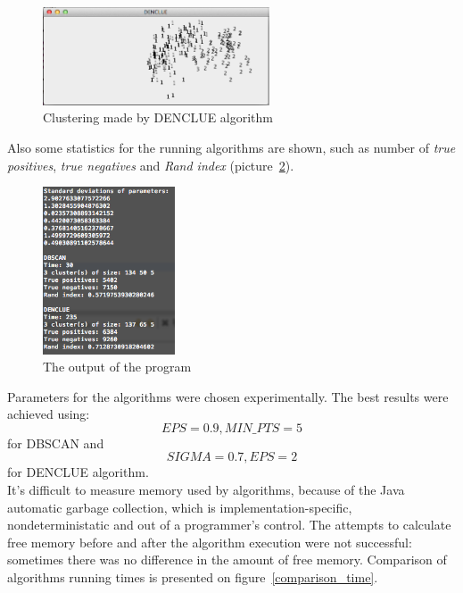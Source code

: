 \documentclass[12pt, a4paper, notitlepage, oneside]{article}
\begin{document}
\begin{figure}[!ht]
 	\centering
	\includegraphics[width=0.6\textwidth]{images/denclue.png}
 	\caption[]
	{Clustering made by DENCLUE algorithm}
		\label{denclue}
	\end{figure}

Also some statistics for the running algorithms are shown, such as number of \textit{true positives}, 
\textit{true negatives} and \textit{Rand index} \cite{rand} (picture~\ref{result}).

\begin{figure}[!ht]
 	\centering
	\includegraphics[width=0.35\textwidth]{images/results.png}
 	\caption[]
	{The output of the program}
		\label{result}
\end{figure}

Parameters for the algorithms were chosen experimentally. The best results were achieved using: 
$$EPS = 0.9, MIN\_PTS = 5$$
for DBSCAN and
$$SIGMA = 0.7, EPS = 2$$
for DENCLUE algorithm. \\

It's difficult to measure memory used by algorithms, because of the Java automatic garbage collection, 
which is implementation-specific, nondeterministatic and out of a programmer's control. 
The attempts to calculate free memory before and after the algorithm execution 
were not successful: sometimes there was no difference in the amount of free memory.
Comparison of algorithms running times is presented on figure~\ref{comparison_time}. \\
\end{document}
